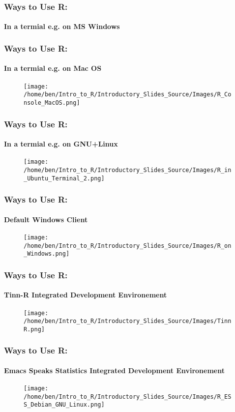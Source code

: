 \documentclass[xcolor=dvipsnames]{beamer}
\begin{document}
\begin{frame}
\frametitle{Ways to Use R:}
\framesubtitle{In a termial e.g. on MS Windows}
\end{frame}

\begin{frame}
\frametitle{Ways to Use R:}
\framesubtitle{In a termial e.g. on Mac OS}
\begin{figure}
\texttt{[image: /home/ben/Intro\_to\_R/Introductory\_Slides\_Source/Images/R\_Console\_MacOS.png]}
\end{figure}
\end{frame}

\begin{frame}
\frametitle{Ways to Use R:}
\framesubtitle{In a termial e.g. on GNU+Linux}
\begin{figure}
\texttt{[image: /home/ben/Intro\_to\_R/Introductory\_Slides\_Source/Images/R\_in\_Ubuntu\_Terminal\_2.png]}
\end{figure}
\end{frame}

\begin{frame}
\frametitle{Ways to Use R:}
\framesubtitle{Default Windows Client}
\begin{figure}
\texttt{[image: /home/ben/Intro\_to\_R/Introductory\_Slides\_Source/Images/R\_on\_Windows.png]}
\end{figure}
\end{frame}

\begin{frame}
\frametitle{Ways to Use R:}
\framesubtitle{Tinn-R Integrated Development Environement}
\begin{figure}
\texttt{[image: /home/ben/Intro\_to\_R/Introductory\_Slides\_Source/Images/TinnR.png]}
\end{figure}
\end{frame}

\begin{frame}
\frametitle{Ways to Use R:}
\framesubtitle{Emacs Speaks Statistics Integrated Development Environement}
\begin{figure}
\texttt{[image: /home/ben/Intro\_to\_R/Introductory\_Slides\_Source/Images/R\_ESS\_Debian\_GNU\_Linux.png]}
\end{figure}
\end{frame}
\end{document}
